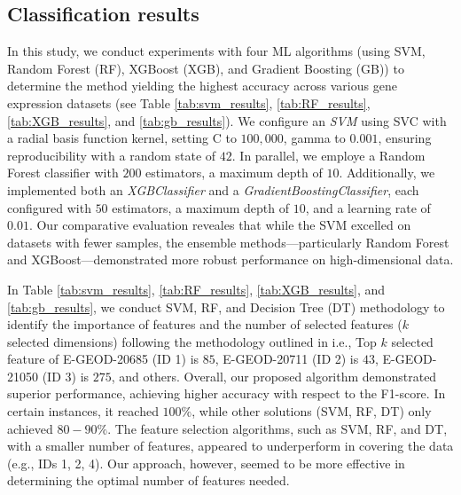  \subsection{Classification results}
In this study, we conduct experiments with four ML algorithms (using SVM, Random Forest (RF), XGBoost (XGB), and Gradient Boosting (GB)) to determine the method yielding the highest accuracy across various gene expression datasets (see Table \ref{tab:svm_results}, \ref{tab:RF_results}, \ref{tab:XGB_results}, and \ref{tab:gb_results}). We configure an \textit{SVM} using SVC with a radial basis function kernel, setting C to $100,000$, gamma to $0.001$, ensuring reproducibility with a random state of $42$. In parallel, we employe a Random Forest classifier with $200$ estimators, a maximum depth of $10$. Additionally, we implemented both an \textit{XGBClassifier} and a \textit{GradientBoostingClassifier}, each configured with $50$ estimators, a maximum depth of $10$, and a learning rate of $0.01$. Our comparative evaluation reveales that while the SVM excelled on datasets with fewer samples, the ensemble methods—particularly Random Forest and XGBoost—demonstrated more robust performance on high-dimensional data. %

In Table \ref{tab:svm_results}, \ref{tab:RF_results}, \ref{tab:XGB_results}, and \ref{tab:gb_results}, we conduct SVM, RF, and Decision Tree (DT) methodology to identify the importance of features and the number of selected features ($k$ selected dimensions) following the methodology outlined in \cite{do2024enhancing} i.e., Top $k$ selected feature of E-GEOD-20685 (ID 1) is $85$, E-GEOD-20711 (ID 2) is $43$, E-GEOD-21050 (ID 3) is $275$, and others. Overall, our proposed algorithm demonstrated superior performance, achieving higher accuracy with respect to the F1-score. In certain instances, it reached $100\%$, while other solutions (SVM, RF, DT) only achieved $80-90\%$. The feature selection algorithms, such as SVM, RF, and DT, with a smaller number of features, appeared to underperform in covering the data (e.g., IDs 1, 2, 4). Our approach, however, seemed to be more effective in determining the optimal number of features needed.



